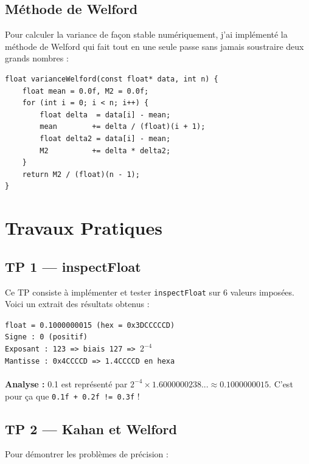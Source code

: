 \documentclass[12pt,a4paper]{report}
\newcommand{\code}[1]{\texttt{\textcolor{myblue}{#1}}}
\begin{document}
\subsection{Méthode de Welford}

Pour calculer la variance de façon stable numériquement, j'ai implémenté la méthode de Welford qui fait tout en une seule passe sans jamais soustraire deux grands nombres :

\begin{lstlisting}[caption={Variance de Welford — numériquement stable}]
float varianceWelford(const float* data, int n) {
    float mean = 0.0f, M2 = 0.0f;
    for (int i = 0; i < n; i++) {
        float delta  = data[i] - mean;
        mean        += delta / (float)(i + 1);
        float delta2 = data[i] - mean;
        M2          += delta * delta2;
    }
    return M2 / (float)(n - 1);
}
\end{lstlisting}

\section{Travaux Pratiques}

\subsection{TP 1 — inspectFloat}

Ce TP consiste à implémenter et tester \code{inspectFloat} sur 6 valeurs imposées. Voici un extrait des résultats obtenus :

\begin{resultbox}
\texttt{float = 0.1000000015 (hex = 0x3DCCCCCD)} \\
\texttt{Signe : 0 (positif)} \\
\texttt{Exposant : 123 => biais 127 => $2^{-4}$} \\
\texttt{Mantisse : 0x4CCCCD => 1.4CCCCD en hexa} \\
\\
\textbf{Analyse :} 0.1 est représenté par $2^{-4} \times 1.6000000238...\approx 0.1000000015$. C'est pour ça que \code{0.1f + 0.2f != 0.3f} !
\end{resultbox}

\subsection{TP 2 — Kahan et Welford}

Pour démontrer les problèmes de précision :
\end{document}
